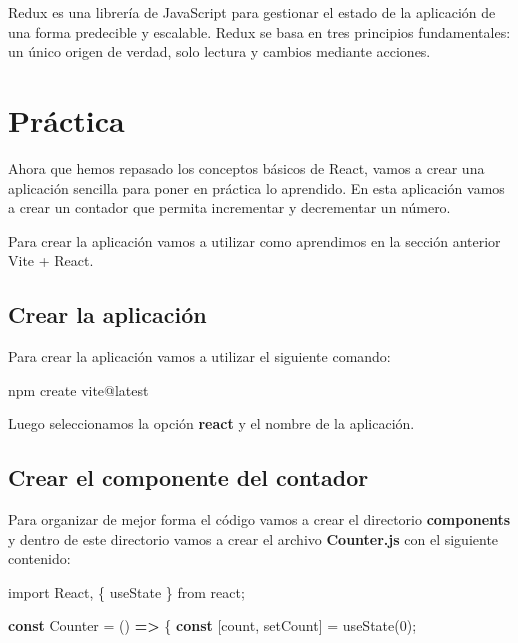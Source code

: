 \documentclass[
  a4paper,
  DIV=11,
  numbers=noendperiod,
  onepage,
  openany]{scrreprt}
\newenvironment{Shaded}{\begin{snugshade}}{\end{snugshade}}
\newcommand{\DecValTok}[1]{\textcolor[rgb]{0.68,0.00,0.00}{#1}}
\newcommand{\ExtensionTok}[1]{\textcolor[rgb]{0.00,0.23,0.31}{#1}}
\newcommand{\FunctionTok}[1]{\textcolor[rgb]{0.28,0.35,0.67}{#1}}
\newcommand{\ImportTok}[1]{\textcolor[rgb]{0.00,0.46,0.62}{#1}}
\newcommand{\KeywordTok}[1]{\textcolor[rgb]{0.00,0.23,0.31}{\textbf{#1}}}
\newcommand{\NormalTok}[1]{\textcolor[rgb]{0.00,0.23,0.31}{#1}}
\newcommand{\OperatorTok}[1]{\textcolor[rgb]{0.37,0.37,0.37}{#1}}
\newcommand{\StringTok}[1]{\textcolor[rgb]{0.13,0.47,0.30}{#1}}
\begin{document}
\begin{tcolorbox}
Redux es una librería de JavaScript para gestionar el estado de la
aplicación de una forma predecible y escalable. Redux se basa en tres
principios fundamentales: un único origen de verdad, solo lectura y
cambios mediante acciones.

\section{Práctica}\label{pruxe1ctica}

Ahora que hemos repasado los conceptos básicos de React, vamos a crear
una aplicación sencilla para poner en práctica lo aprendido. En esta
aplicación vamos a crear un contador que permita incrementar y
decrementar un número.

Para crear la aplicación vamos a utilizar como aprendimos en la sección
anterior Vite + React.

\subsection{Crear la aplicación}\label{crear-la-aplicaciuxf3n}

Para crear la aplicación vamos a utilizar el siguiente comando:

\begin{Shaded}
\begin{Highlighting}[]
\ExtensionTok{npm}\NormalTok{ create vite@latest}
\end{Highlighting}
\end{Shaded}

Luego seleccionamos la opción \textbf{react} y el nombre de la
aplicación.

\subsection{Crear el componente del
contador}\label{crear-el-componente-del-contador}

Para organizar de mejor forma el código vamos a crear el directorio
\textbf{components} y dentro de este directorio vamos a crear el archivo
\textbf{Counter.js} con el siguiente contenido:

\begin{Shaded}
\begin{Highlighting}[]
\ImportTok{import}\NormalTok{ React}\OperatorTok{,}\NormalTok{ \{ useState \} }\ImportTok{from} \StringTok{\textquotesingle{}react\textquotesingle{}}\OperatorTok{;}

\KeywordTok{const}\NormalTok{ Counter }\OperatorTok{=}\NormalTok{ () }\KeywordTok{=\textgreater{}}\NormalTok{ \{}
  \KeywordTok{const}\NormalTok{ [count}\OperatorTok{,}\NormalTok{ setCount] }\OperatorTok{=} \FunctionTok{useState}\NormalTok{(}\DecValTok{0}\NormalTok{)}\OperatorTok{;}


\end{Highlighting}
\end{Shaded}
\end{tcolorbox}
\end{document}
